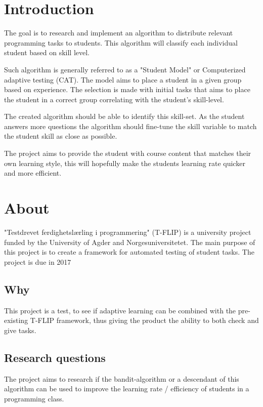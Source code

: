 
\section{Introduction}
The goal is to research and implement an algorithm to distribute relevant programming tasks to students. This algorithm will classify each individual student based on skill level. 

Such algorithm is generally referred to as a "Student Model" or  Computerized adaptive testing (CAT)\cite{CAT}. The model aims to place a student in a given group based on experience. The selection is made with initial tasks that aims to place the student in a correct group correlating with the student's skill-level. 

The created algorithm should be able to identify this skill-set. As the student answers more questions the algorithm should fine-tune the skill variable to match the student skill as close as possible. 

The project aims to provide the student with course content that matches their own learning style, this will hopefully make the students learning rate quicker and more efficient.

\clearpage


\section{About}
"Testdrevet ferdighetslærling i programmering" (T-FLIP) \cite{website:tflip} is a university project funded by the University of Agder and Norgesuniversitetet. The main purpose of this project is to create a framework for automated testing of student tasks.
The project is due in 2017

\subsection{Why}
This project is a test, to see if adaptive learning can be combined with the pre-existing T-FLIP framework, thus giving the product the ability to both check and give tasks. 



\subsection{Research questions}

The project aims to research if the bandit-algorithm or a descendant of this algorithm can be used to improve the learning rate / efficiency of students in a programming class.



